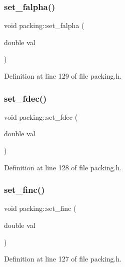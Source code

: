 \subsubsection{\texorpdfstring{set\+\_\+falpha()}{set\_falpha()}}
{\footnotesize\ttfamily void packing\+::set\+\_\+falpha (\begin{DoxyParamCaption}\item[{double}]{val }\end{DoxyParamCaption})\hspace{0.3cm}{\ttfamily [inline]}}



Definition at line 129 of file packing.\+h.

\mbox{\label{classpacking_aaa7a1eb80bdf6f80a8d91415e4e03e69}} 
\subsubsection{\texorpdfstring{set\+\_\+fdec()}{set\_fdec()}}
{\footnotesize\ttfamily void packing\+::set\+\_\+fdec (\begin{DoxyParamCaption}\item[{double}]{val }\end{DoxyParamCaption})\hspace{0.3cm}{\ttfamily [inline]}}



Definition at line 128 of file packing.\+h.

\mbox{\label{classpacking_a8cb03b2d0af8408ba4c590ade7c738ca}} 
\subsubsection{\texorpdfstring{set\+\_\+finc()}{set\_finc()}}
{\footnotesize\ttfamily void packing\+::set\+\_\+finc (\begin{DoxyParamCaption}\item[{double}]{val }\end{DoxyParamCaption})\hspace{0.3cm}{\ttfamily [inline]}}



Definition at line 127 of file packing.\+h.

